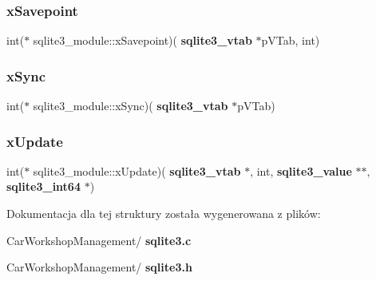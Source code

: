 \subsubsection{xSavepoint}
{\footnotesize\ttfamily int($\ast$ sqlite3\+\_\+module\+::x\+Savepoint)(\textbf{ sqlite3\+\_\+vtab} $\ast$p\+V\+Tab, int)}

\mbox{\label{structsqlite3__module_a895d78529db2e28e13d1d842512770b6}} 
\subsubsection{xSync}
{\footnotesize\ttfamily int($\ast$ sqlite3\+\_\+module\+::x\+Sync)(\textbf{ sqlite3\+\_\+vtab} $\ast$p\+V\+Tab)}

\mbox{\label{structsqlite3__module_a029d0713dbb3c847a6de773a0a179605}} 
\subsubsection{xUpdate}
{\footnotesize\ttfamily int($\ast$ sqlite3\+\_\+module\+::x\+Update)(\textbf{ sqlite3\+\_\+vtab} $\ast$, int, \textbf{ sqlite3\+\_\+value} $\ast$$\ast$, \textbf{ sqlite3\+\_\+int64} $\ast$)}



Dokumentacja dla tej struktury została wygenerowana z plików\+:\begin{DoxyCompactItemize}
\item 
Car\+Workshop\+Management/\textbf{ sqlite3.\+c}\item 
Car\+Workshop\+Management/\textbf{ sqlite3.\+h}\end{DoxyCompactItemize}
